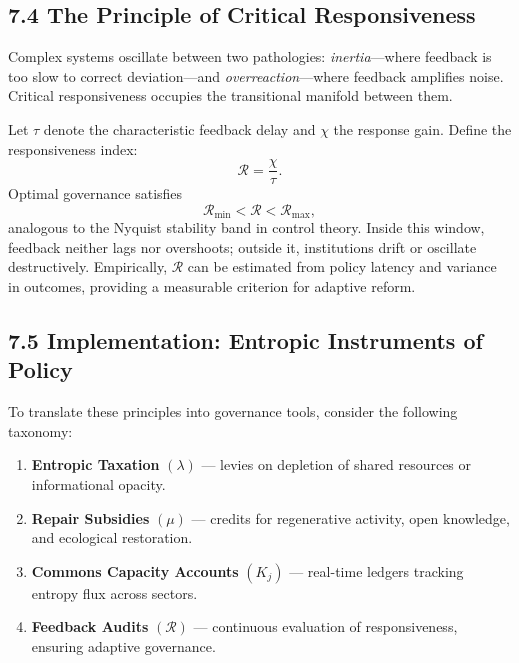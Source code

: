 \documentclass[11pt,a4paper,titlepage]{article}
\theoremstyle{definition}
\begin{document}
\subsection{7.4 The Principle of Critical Responsiveness}

Complex systems oscillate between two pathologies:
\emph{inertia}—where feedback is too slow to correct deviation—and
\emph{overreaction}—where feedback amplifies noise.  
Critical responsiveness occupies the transitional manifold between them.

Let $\tau$ denote the characteristic feedback delay and $\chi$ the response
gain.  Define the responsiveness index:
\begin{equation}
\mathcal{R} = \frac{\chi}{\tau}.
\label{eq:responsiveness}
\end{equation}
Optimal governance satisfies
\begin{equation}
\mathcal{R}_{\min} < \mathcal{R} < \mathcal{R}_{\max},
\label{eq:critical_band}
\end{equation}
analogous to the Nyquist stability band in control theory.
Inside this window, feedback neither lags nor overshoots;
outside it, institutions drift or oscillate destructively.
Empirically, $\mathcal{R}$ can be estimated from policy latency and
variance in outcomes, providing a measurable criterion for adaptive reform.

\subsection{7.5 Implementation: Entropic Instruments of Policy}

To translate these principles into governance tools, consider the following
taxonomy:

\begin{enumerate}[label=\textbf{(\alph*)},leftmargin=2em]
\item \textbf{Entropic Taxation} $(\lambda)$ — levies on depletion of shared
      resources or informational opacity.
\item \textbf{Repair Subsidies} $(\mu)$ — credits for regenerative activity,
      open knowledge, and ecological restoration.
\item \textbf{Commons Capacity Accounts} $(K_j)$ — real-time ledgers tracking
      entropy flux across sectors.
\item \textbf{Feedback Audits} $(\mathcal{R})$ — continuous evaluation of
      responsiveness, ensuring adaptive governance.
\end{enumerate}
\end{document}
